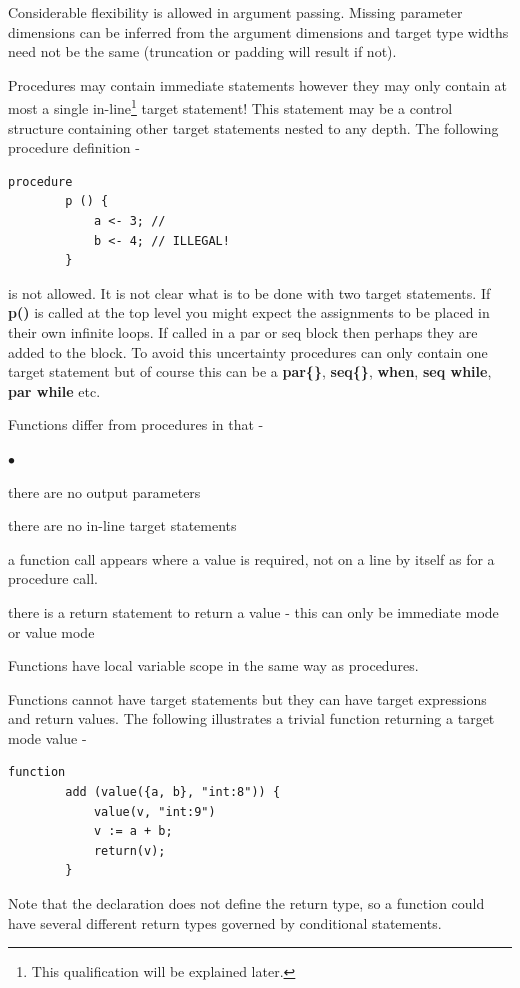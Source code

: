 \documentclass[10pt,a4paper,twoside,fleqn]{article}
\newcommand{\blist}{\begin{list}{$\bullet$}{\setlength{\itemsep}{-5pt}\setlength{\topsep}{-5pt}}}
\newcommand{\blend}{\end{list}}
\newcommand{\kwd}[1]{{\bf #1}} %
\newcommand{\var}[1]{{\bf #1}} %
\begin{document}
    Considerable flexibility is allowed in argument passing. Missing parameter
    dimensions can be inferred from the argument dimensions and target type widths
    need not be the same (truncation or padding will result if not).
    
    Procedures may contain immediate statements however they may only contain at
    most a single in-line\footnote{This qualification will be explained later.}
    target statement! This statement may be a control structure containing other
    target statements nested to any depth. The following procedure definition -
    \begin{lstlisting}[language=threepl]
        procedure
        p () {
            a <- 3; //
            b <- 4; // ILLEGAL!
        }
    \end{lstlisting}
    is not allowed. It is not clear what is to be done with two target statements.
    If \var{p()} is called at the top level you might expect the assignments to be
    placed in their own infinite loops. If called in a par{} or seq{} block then
    perhaps they are added to the block. To avoid this uncertainty procedures
    can only contain one target statement but of course this can be a
    \kwd{par\{\}}, \kwd{seq\{\}}, \kwd{when}, \kwd{seq while}, \kwd{par while} etc.
    
    Functions differ from procedures in that -
    \blist
    \item   there are no output parameters
    \item   there are no in-line target statements
    \item   a function call appears where a value is required, not on
            a line by itself as for a procedure call.
    \item   there is a return statement to return a value - this can only
            be immediate mode or value mode
    \blend
    
    Functions have local variable scope in the same way as procedures.
    
    Functions cannot have target statements but they can have target
    expressions and return values. The following illustrates a trivial
    function returning a target mode value -
    \begin{lstlisting}[language=threepl]
        function
        add (value({a, b}, "int:8")) {
            value(v, "int:9")
            v := a + b;
            return(v);
        }
    \end{lstlisting}
    Note that the declaration does not define the return type, so a function
    could have several different return types governed by conditional
    statements.
    
\end{document}

